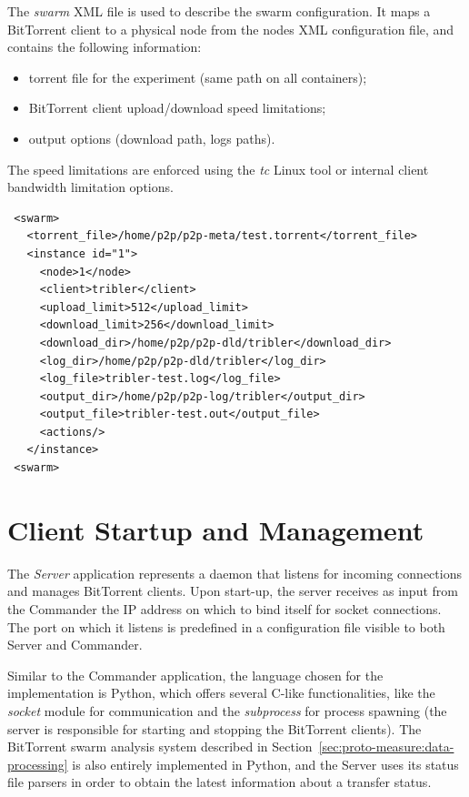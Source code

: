The \textit{swarm} XML file is used to describe the swarm configuration. It
maps a BitTorrent client to a physical node from the nodes XML configuration
file, and contains the following information:

\begin{itemize}
  \item torrent file for the experiment (same path on all containers);
  \item BitTorrent client upload/download speed limitations;
  \item output options (download path, logs paths).
\end{itemize}

The speed limitations are enforced using the \textit{tc} Linux tool or
internal client bandwidth limitation options.

\scriptsize
\begin{verbatim}
 <swarm>
   <torrent_file>/home/p2p/p2p-meta/test.torrent</torrent_file>
   <instance id="1">
     <node>1</node>
     <client>tribler</client>
     <upload_limit>512</upload_limit>
     <download_limit>256</download_limit>
     <download_dir>/home/p2p/p2p-dld/tribler</download_dir>
     <log_dir>/home/p2p/p2p-dld/tribler</log_dir>
     <log_file>tribler-test.log</log_file>
     <output_dir>/home/p2p/p2p-log/tribler</output_dir>
     <output_file>tribler-test.out</output_file>
     <actions/>
   </instance>
 <swarm>
\end{verbatim}
\normalsize

\section{Client Startup and Management}
\label{sec:deploy-startup}

The \textit{Server} application represents a daemon that listens for incoming
connections and manages BitTorrent clients. Upon start-up, the server receives
as input from the Commander the IP address on which to bind itself for socket
connections. The port on which it listens is predefined in a configuration
file visible to both Server and Commander.

Similar to the Commander application, the language chosen for the
implementation is Python, which offers several C-like functionalities, like
the \textit{socket} module for communication and the \textit{subprocess} for
process spawning (the server is responsible for starting and stopping the
BitTorrent clients). The BitTorrent swarm analysis system described in
Section~\ref{sec:proto-measure:data-processing} is also entirely implemented
in Python, and the Server uses its status file parsers in order to obtain the
latest information about a transfer status.

